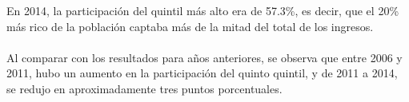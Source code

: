  En 2014, la participación del quintil más alto era de 57.3\%, es decir, que el 20\% más rico de la población captaba más de la mitad del total de los ingresos. \\\\
Al comparar con los resultados para años anteriores, se observa que entre 2006 y 2011, hubo un aumento en la participación del quinto quintil, y de 2011 a 2014, se redujo en aproximadamente   tres puntos porcentuales.  